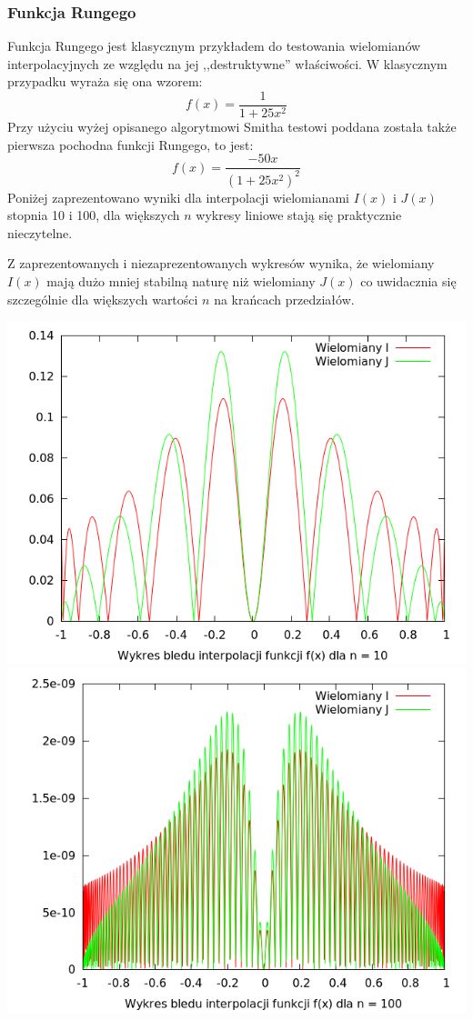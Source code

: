 \documentclass[11pt,leqno]{article}
\begin{document}
\subsubsection{Funkcja Rungego}
Funkcja Rungego jest klasycznym przykładem do testowania wielomianów interpolacyjnych ze względu na jej ,,destruktywne'' właściwości. W klasycznym przypadku wyraża się ona wzorem:
\[
  f(x) = \frac{1}{1 + 25x^2}
\]
Przy użyciu wyżej opisanego algorytmowi Smitha testowi poddana została także pierwsza pochodna funkcji Rungego, to jest:
\[
  f(x) = \frac{-50 x}{(1 + 25x^2)^2}
\]
Poniżej zaprezentowano wyniki dla interpolacji wielomianami $I(x)$ i $J(x)$ stopnia 10 i 100, dla większych $n$ wykresy liniowe stają się praktycznie nieczytelne.

Z zaprezentowanych i niezaprezentowanych wykresów wynika, że wielomiany $I(x)$ mają dużo mniej stabilną naturę niż wielomiany $J(x)$ co uwidacznia się szczególnie dla większych wartości $n$ na krańcach przedziałów.

\begin{center}
\includegraphics[scale=0.65,natwidth=640,natheight=480]{plot/runge10e.png}\\
\includegraphics[scale=0.65,natwidth=640,natheight=480]{plot/runge100e.png}\\
\end{center}
\end{document}
